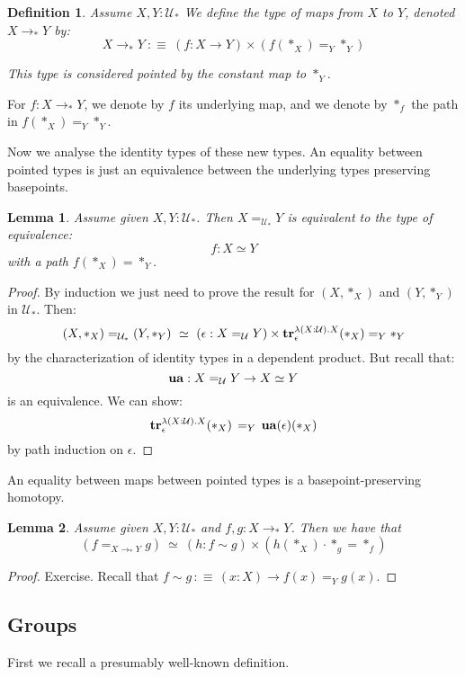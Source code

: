 \documentclass{article}
\newcommand{\sse}[1]{\medbreak \subsection{#1}}
\newcommand{\U}{{\mathcal U}}
\renewcommand{\r}{\rightarrow}
\newcommand{\Gl}{\lambda}
\newcommand{\tr}{\mathrm{\bf tr}}
\newcommand{\ua}{\mathrm{\bf ua}}
\newcommand{\Map}{\mathrm{Map}}
\newtheorem{lemma}{Lemma}
\newtheorem{definition}{Definition}
\begin{document}
\begin{definition}
Assume $X, Y:\U_*$ We define the type of maps from $X$ to $Y$, denoted $X\r_*Y$ by:
\[X\r_*Y \ :\equiv\ (f:X\r Y)\times (f(*_X) =_Y *_Y)\]

This type is considered pointed by the constant map to $*_Y$.
\end{definition}

For $f:X\r_*Y$, we denote by $f$ its underlying map, and we denote by $*_f$ the path in $f(*_X)=_Y*_Y$.


Now we analyse the identity types of these new types. An equality between pointed types is just an equivalence between the underlying types preserving basepoints.

\begin{lemma}
Assume given $X,Y:\U_*$. Then $X=_{\U_*} Y$ is equivalent to the type of equivalence:
\[f:X\simeq Y\]
 with a path $f(*_X)=*_Y$.
\end{lemma}
\begin{proof}
By induction we just need to prove the result for $(X,*_X)$ and $(Y,*_Y)$ in $\U_*$. Then:
\[(X,*_X) =_{\U_*}(Y,*_Y) \ \simeq \ (\epsilon : X=_\U Y)\times \tr_\epsilon^{\Gl(X:\U).X}(*_X) =_Y *_Y\]
by the characterization of identity types in a dependent product. But recall that: 
\[\ua : X=_\U Y\r X\simeq Y\] 
is an equivalence. We can show:
\[\tr_\epsilon^{\Gl(X:\U).X}(*_X) \, =_Y \, \ua(\epsilon)(*_X)\]
by path induction on $\epsilon$.
\end{proof}

An equality between maps between pointed types is a basepoint-preserving homotopy.

\begin{lemma}
Assume given $X,Y:\U_*$ and $f,g:X\r_* Y$. Then we have that 
\[(f=_{X\r_*Y}g) \ \simeq \ (h:f\sim g)\times (h(*_X) \cdot *_g =  *_f) \]
\end{lemma}
\begin{proof}
Exercise. Recall that $f\sim g \, :\equiv\, (x:X)\r f(x) =_Y g(x)$.
\end{proof}



\sse{Groups}

First we recall a presumably well-known definition.
\end{document}
